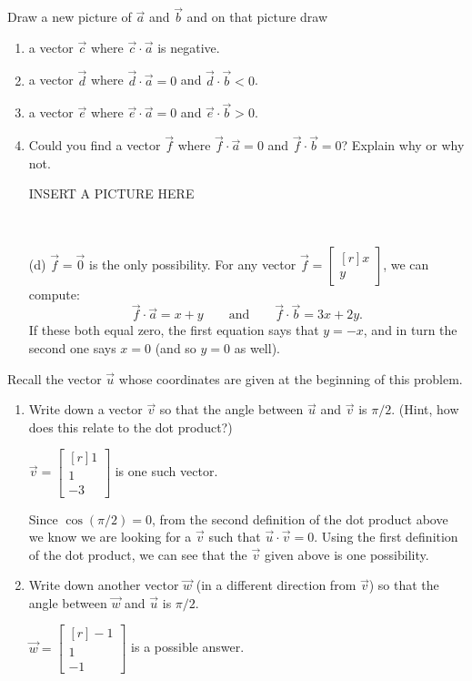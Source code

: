 \documentclass{problemset}
\newcommand{\mat}[1]{\begin{bmatrix*}[r]#1\end{bmatrix*}}
\begin{document}
\begin{parts}
		\item Draw a new picture of $\vec a$ and $\vec b$ and on that picture draw
		\begin{enumerate}	
			\item a vector $\vec c$ where $\vec c\cdot \vec a$ is negative.
			\item a vector $\vec d$ where $\vec d\cdot \vec a=0$ and $\vec d\cdot \vec b < 0$.
			\item a vector $\vec e$ where $\vec e\cdot \vec a=0$ and $\vec e\cdot \vec b>0$.
			\item Could you find a vector $\vec f$ where $\vec f\cdot \vec a=0$ and $\vec f\cdot \vec b=0$?
				Explain why or why not.
				\begin{solution}
					INSERT A PICTURE HERE

					\ 

					(d) $\vec f = \vec 0$ is the only possibility. For any vector 
					$\vec f = \mat{x\\y}$, we can compute:
					\[
						\vec f\cdot \vec a = x + y 
						\qquad \text{and} \qquad
						\vec f\cdot \vec b = 3x + 2y.
					\]
					If these both equal zero, the first equation says that $y = -x$,
					and in turn the second one says $x = 0$ (and so $y = 0$ as well).
				\end{solution}
		\end{enumerate}

		\item Recall the vector $\vec u$ whose coordinates are given at the beginning of this problem.
		\begin{enumerate}
			\item Write down a vector $\vec v$ so that the angle between $\vec u$ 
				and $\vec v$ is $\pi/2$. (Hint, how does this relate to the dot 
				product?)
				\begin{solution}
					$\vec v = \mat{1\\1\\-3}$ is one such vector. 

					Since $\cos(\pi/2) = 0$, from the second definition of the dot 
					product above we know we are looking for a $\vec v$ such that
					$\vec u \cdot \vec v = 0$. Using the first definition of the 
					dot product, we can see that the $\vec v$ given above is one 
					possibility. 
				\end{solution}
			\item Write down another vector $\vec w$ (in a different direction from 
				$\vec v$) so that the angle between $\vec w$ and $\vec u$ is $\pi/2$.
				\begin{solution}
					$\vec w = \mat{-1\\1\\-1}$ is a possible answer. 


\end{solution}
\end{enumerate}
\end{parts}
\end{document}
